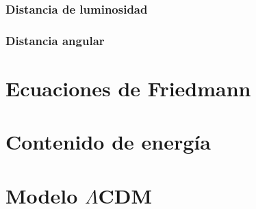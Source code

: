 \documentclass[../main]{subfiles}
\begin{document}
\subsubsection{Distancia de luminosidad}

\subsubsection{Distancia angular}

\section{Ecuaciones de Friedmann}

\section{Contenido de energía}

\section{Modelo $\Lambda$CDM}
\end{document}

